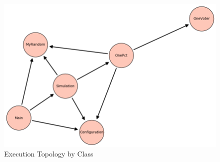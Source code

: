 \begin{figure}
\begin{center}
\includegraphics[width=\textwidth]{execution_topology}
\end{center}
\caption{Execution Topology by Class} \label{hxtk-exec-topology}
\end{figure}